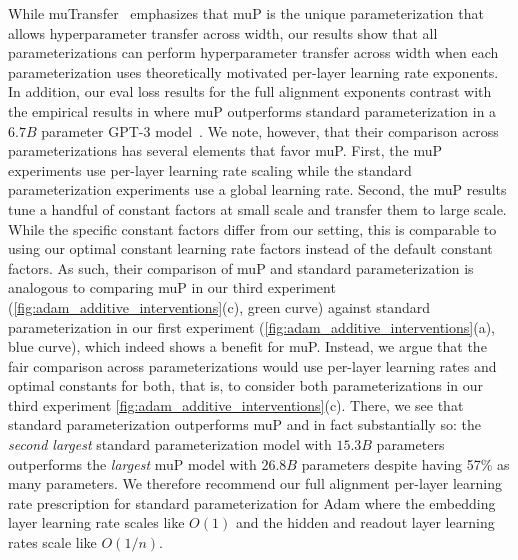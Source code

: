 \documentclass{article}
\theoremstyle{plain}
\theoremstyle{definition}
\theoremstyle{remark}
\begin{document}
While muTransfer~\citep{yang2022tensorv} emphasizes that muP is the unique parameterization that allows hyperparameter transfer across width, our results show that all parameterizations can perform hyperparameter transfer across width when each parameterization uses theoretically motivated per-layer learning rate exponents. In addition, our eval loss results for the full alignment exponents contrast with the empirical results in \citet{yang2022tensorv} where muP outperforms standard parameterization in a $6.7B$ parameter GPT-3 model~\citep{brown2020gpt3}. We note, however, that their comparison across parameterizations has several elements that favor muP. First, the muP experiments use per-layer learning rate scaling while the standard parameterization experiments use a global learning rate. Second, the muP results tune a handful of constant factors at small scale and transfer them to large scale. While the specific constant factors differ from our setting, this is comparable to using our optimal constant learning rate factors instead of the default constant factors. As such, their comparison of muP and standard parameterization is analogous to comparing muP in our third experiment (\cref{fig:adam_additive_interventions}(c), green curve) against standard parameterization in our first experiment (\cref{fig:adam_additive_interventions}(a), blue curve), which indeed shows a benefit for muP. Instead, we argue that the fair comparison across parameterizations would use per-layer learning rates and optimal constants for both, that is, to consider both parameterizations in our third experiment \cref{fig:adam_additive_interventions}(c). There, we see that standard parameterization outperforms muP and in fact substantially so: the \emph{second largest} standard parameterization model with $15.3B$ parameters outperforms the \emph{largest} muP model with $26.8B$ parameters despite having 57\% as many parameters. We therefore recommend our full alignment per-layer learning rate prescription for standard parameterization for Adam where the embedding layer learning rate scales like $O(1)$ and the hidden and readout layer learning rates scale like $O(1/n)$.
\end{document}
